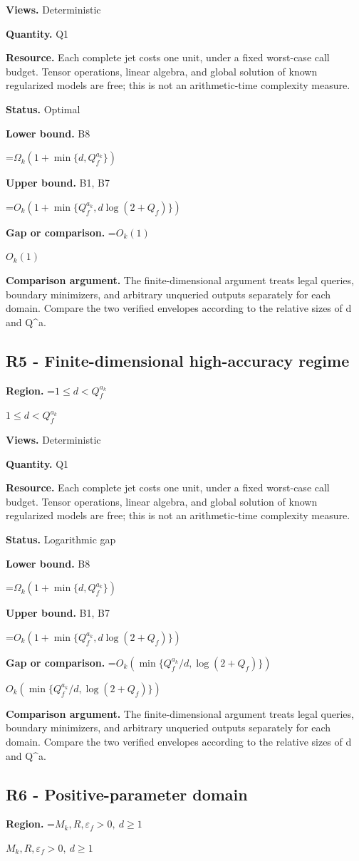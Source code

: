 \documentclass[10pt,a4paper]{article}
\newcommand{\AtlasMath}[1]{\par\begingroup\centering\setbox0=\hbox{$\displaystyle #1$}\ifdim\wd0>1.4\linewidth\typeout{ATLAS WIDE FORMULA: \the\wd0}\fi\ifdim\wd0>\linewidth\resizebox{\linewidth}{!}{\box0}\else\box0\fi\par\endgroup}
\newcommand{\AtlasInlineMath}[1]{\begingroup\setbox0=\hbox{$#1$}\ifdim\wd0>.4\linewidth\endgroup\AtlasMath{#1}\else\endgroup$#1$\fi}
\begin{document}
\textbf{Views.} Deterministic

\textbf{Quantity.} Q1

\textbf{Resource.} Each complete jet costs one unit, under a fixed worst-case call budget. Tensor operations, linear algebra, and global solution of known regularized models are free; this is not an arithmetic-time complexity measure.

\textbf{Status.} Optimal

\textbf{Lower bound.} B8

\AtlasMath{\Omega_k(1+\min\{d,Q_f^{a_k}\})}
\textbf{Upper bound.} B1, B7

\AtlasMath{O_k(1+\min\{Q_f^{a_k},d\log(2+Q_f)\})}
\textbf{Gap or comparison.} \AtlasInlineMath{O_k(1)}

\textbf{Comparison argument.} The finite-dimensional argument treats legal queries, boundary minimizers, and arbitrary unqueried outputs separately for each domain. Compare the two verified envelopes according to the relative sizes of d and Q\textasciicircum{}a.

\subsection{R5 - Finite-dimensional high-accuracy regime}
\textbf{Region.} \AtlasInlineMath{1\le d<Q_f^{a_k}}

\textbf{Views.} Deterministic

\textbf{Quantity.} Q1

\textbf{Resource.} Each complete jet costs one unit, under a fixed worst-case call budget. Tensor operations, linear algebra, and global solution of known regularized models are free; this is not an arithmetic-time complexity measure.

\textbf{Status.} Logarithmic gap

\textbf{Lower bound.} B8

\AtlasMath{\Omega_k(1+\min\{d,Q_f^{a_k}\})}
\textbf{Upper bound.} B1, B7

\AtlasMath{O_k(1+\min\{Q_f^{a_k},d\log(2+Q_f)\})}
\textbf{Gap or comparison.} \AtlasInlineMath{O_k(\min\{Q_f^{a_k}/d,\log(2+Q_f)\})}

\textbf{Comparison argument.} The finite-dimensional argument treats legal queries, boundary minimizers, and arbitrary unqueried outputs separately for each domain. Compare the two verified envelopes according to the relative sizes of d and Q\textasciicircum{}a.

\subsection{R6 - Positive-parameter domain}
\textbf{Region.} \AtlasInlineMath{M_k,R,\varepsilon_f>0,\ d\ge1}
\end{document}
